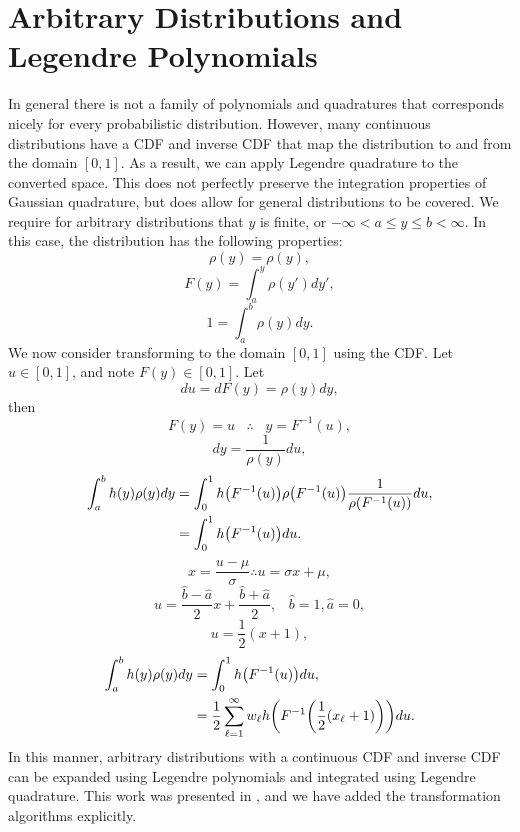 \section{Arbitrary Distributions and Legendre Polynomials}
In general there is not a family of polynomials and quadratures that corresponds nicely for every
probabilistic distribution.  However, many continuous distributions have a CDF and inverse CDF that map the
distribution to and from the domain $[0,1]$.  As a result, we can apply Legendre quadrature to the
converted space.  This does not perfectly preserve the integration properties of Gaussian quadrature, but does
allow for general distributions to be covered.  We require for arbitrary distributions that
$y$ is finite, or $-\infty < a \leq y \leq b < \infty$.  In this case, the distribution has the following properties:
\begin{equation}
  \rho(y) = \rho(y),
\end{equation}
\begin{equation}
  F(y) = \int_{a}^y \rho(y')dy',
\end{equation}
\begin{equation}
  1 = \int_{a}^b \rho(y)dy. 
\end{equation}
We now consider transforming to the domain $[0,1]$ using the CDF.
Let $u\in[0,1]$, and note $F(y)\in[0,1]$.
Let
\begin{equation}
  du = dF(y) = \rho(y)dy,
\end{equation}
then
\begin{equation}
  F(y)=u\hspace{10pt}\therefore\hspace{10pt}y=F^{-1}(u),
\end{equation}
\begin{equation}
  dy = \frac{1}{\rho(y)}du,
\end{equation}
\begin{align}
\int_a^b h(y)\rho(y)dy &= \int_0^1 h\qty(F^{-1}(u))\rho\qty(F^{-1}(u))\frac{1}{\rho\qty(F^{-1}(u))}du,\\
  &=\int_0^1 h\qty(F^{-1}(u))du.
\end{align}
\begin{equation}
x = \frac{u-\mu}{\sigma}\therefore u=\sigma x+\mu,
\end{equation}
\begin{equation}
u = \frac{\hat b-\hat a}{2}x+\frac{\hat b+\hat a}{2},\hspace{10pt}\hat b=1,\hat a=0,
\end{equation}
\begin{equation}
u = \frac{1}{2}(x+1),
\end{equation}
\begin{align}
\int_a^b h(y)\rho(y)dy&= \int_0^1 h\qty(F^{-1}(u))du,\\
  &=\frac{1}{2}\sum_{\ell=1}^\infty w_\ell h\qty(F^{-1}\qty(\frac{1}{2}(x_\ell+1)))du.
\end{align}
In this manner, arbitrary distributions with a continuous CDF and inverse CDF can be expanded using Legendre
polynomials and integrated using Legendre quadrature.  This work was presented in \cite{xiu}, and we have
added the transformation algorithms explicitly.
